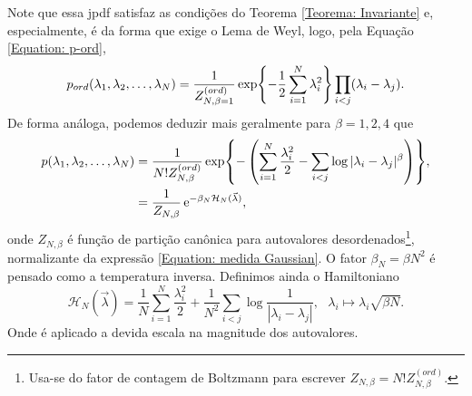 Note que essa jpdf satisfaz as condições do Teorema \ref{Teorema: Invariante} e, especialmente, é da forma que exige o Lema de Weyl, logo, pela Equação \ref{Equation: p-ord}, $$ p_{ord}(\lambda_1, \lambda_2, \dots, \lambda_N) = \frac{1}{Z_{N, \beta = 1}^{(ord)}} \exp{-\frac{1}{2} \sum_{i = 1}^{N} \lambda_i^2} \prod_{i < j} (\lambda_i - \lambda_j).$$ 
De forma análoga, podemos deduzir mais geralmente para $\beta = 1,2,4$ que
\begin{equation}
	\begin{split}
		p(\lambda_1, \lambda_2, \dots, \lambda_N) 
		&= \frac{1}{ N! Z_{N, \beta}^{(ord)}} \exp{- \left(\sum_{i = 1}^{N} \frac{\lambda_i^2}{2} - \sum_{i < j} \log{|\lambda_i - \lambda_j|^{\beta}} \right)}, \\
		&= \frac{1}{Z_{N, \beta}} \operatorname{e}^{-\beta_N \mathcal{H}_N(\vec{\lambda})},
	\end{split}
\label{Equation: medida Gaussian}
\end{equation}
onde $Z_{N, \beta}$ é função de partição canônica para autovalores desordenados\footnote{Usa-se do fator de contagem de Boltzmann para escrever $ Z_{N, \beta} = N! Z_{N, \beta}^{(ord)}$.}, normalizante da expressão \ref{Equation: medida Gaussian}. O fator $\beta_N = \beta N^2$ é pensado como a temperatura inversa. Definimos ainda o Hamiltoniano $$\mathcal{H}_N(\vec{\lambda}) = \frac{1}{N}\sum_{i = 1}^{N} \frac{\lambda_i^2}{2} + \frac{1}{N^2} \sum_{i < j} \log{\frac{1}{|\lambda_i - \lambda_j|}}, \ \ \  \lambda_i \mapsto \lambda_i \sqrt{\beta N}.$$ Onde é aplicado a devida escala na magnitude dos autovalores.

